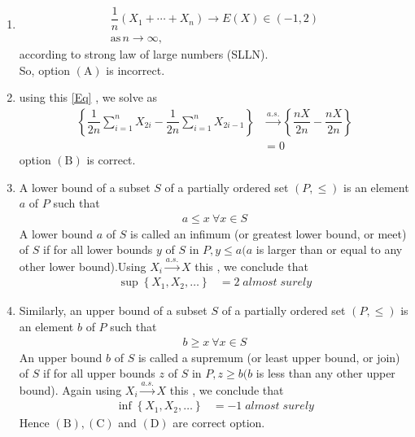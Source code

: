 \documentclass[journal,12pt,twocolumn]{IEEEtran}
\begin{document}
\begin{enumerate}[label=\alph*)]
\item\begin{align}
\dfrac{1}{n}\left(X_{1}+\cdots+X_{n}\right) \rightarrow E(X)\in(-1,2)\\
\text{as} \, n\rightarrow\infty,
\end{align}
according to strong law of large numbers (SLLN).\\
So, option $(\mathrm{A})$ is incorrect.
\item using this \ref{Eq} , we solve as
\begin{align}
\left\{\dfrac{1}{2 n} \sum_{i=1}^{n} X_{2 i}-\dfrac{1}{2 n} \sum_{i=1}^{n} X_{2 i-1}\right\}&\stackrel{a.s.}{\rightarrow}\left\{\dfrac{nX}{2 n}-\dfrac{nX}{2 n}\right\}\\
&=0
\end{align}
option $(\mathrm{B})$ is correct.
\item A lower bound of a subset $S$ of a partially ordered set $(P, \leq)$ is an element $a$ of $P$ such that
\begin{align}
a \leq x \: \forall x \in S
\end{align}
A lower bound $a$ of $S$ is called an infimum (or greatest lower bound, or meet) of $S$ if for all lower bounds $y$ of $S$ in $P, y \leq a(a$ is larger than or equal to any other lower bound).Using $X_i \stackrel{a.s.}{\rightarrow} X$ this , we  conclude that
\begin{align}
\sup \left\{X_{1}, X_{2}, \ldots\right\}&=2 \;almost\; surely
\end{align}
\item Similarly, an upper bound of a subset $S$ of a partially ordered set $(P, \leq)$ is an element $b$ of $P$ such that
\begin{align}
b \geq x \: \forall x \in S
\end{align}
An upper bound $b$ of $S$ is called a supremum (or least upper bound, or join) of $S$ if
for all upper bounds $z$ of $S$ in $P, z \geq b(b$ is less than any other upper bound). Again using $X_i \stackrel{a.s.}{\rightarrow} X$ this , we conclude that
\begin{align}
\inf \left\{X_{1}, X_{2}, \ldots\right\}&=-1 \;almost\; surely
\end{align}
Hence $(\mathrm{B}),(\mathrm{C})$ and $(\mathrm{D})$ are correct option.
\end{enumerate}
\end{document}
